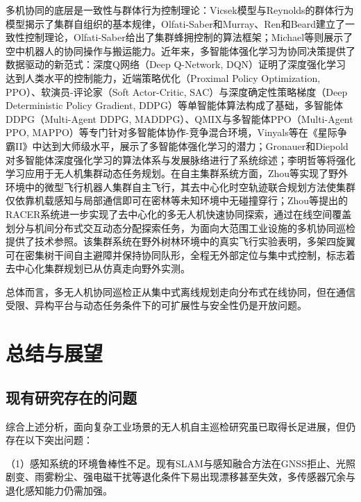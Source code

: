 多机协同的底层是一致性与群体行为控制理论：Vicsek模型\cite{vicsek1995novel}与Reynolds的群体行为模型\cite{reynolds1987flocks}揭示了集群自组织的基本规律，Olfati-Saber和Murray\cite{olfati2004consensus}、Ren和Beard\cite{ren2005consensus}建立了一致性控制理论，Olfati-Saber\cite{olfati2006flocking}给出了集群蜂拥控制的算法框架；Michael等则展示了空中机器人的协同操作与搬运能力。近年来，多智能体强化学习为协同决策提供了数据驱动的新范式：深度Q网络（Deep Q-Network, DQN）\cite{mnih2015human}证明了深度强化学习达到人类水平的控制能力，近端策略优化（Proximal Policy Optimization, PPO）\cite{schulman2017proximal}、软演员-评论家（Soft Actor-Critic, SAC）\cite{haarnoja2018soft}与深度确定性策略梯度（Deep Deterministic Policy Gradient, DDPG）\cite{lillicrap2016continuous}等单智能体算法构成了基础，多智能体DDPG（Multi-Agent DDPG, MADDPG）\cite{lowe2017multi}、QMIX\cite{rashid2018qmix}与多智能体PPO（Multi-Agent PPO, MAPPO）\cite{yu2022surprising}等专门针对多智能体协作-竞争混合环境，Vinyals等在《星际争霸II》中达到大师级水平，展示了多智能体强化学习的潜力；Gronauer和Diepold\cite{gronauer2022marl}对多智能体深度强化学习的算法体系与发展脉络进行了系统综述；李明哲等\cite{limz2023dynamic}将强化学习应用于无人机集群动态任务规划。在自主集群系统方面，Zhou等\cite{zhou2022swarm}实现了野外环境中的微型飞行机器人集群自主飞行，其去中心化时空轨迹联合规划方法\cite{zhou2021decentralized}使集群仅依靠机载感知与局部通信即可在密林等未知环境中无碰撞穿行；Zhou等\cite{zhou2023racer}提出的RACER系统进一步实现了去中心化的多无人机快速协同探索，通过在线空间覆盖划分与机间分布式交互动态分配探索任务，为面向大范围工业设施的多机协同巡检提供了技术参照。该集群系统在野外树林环境中的真实飞行实验表明，多架四旋翼可在密集树干间自主避障并保持协同队形，全程无外部定位与集中式控制，标志着去中心化集群规划已从仿真走向野外实测。


总体而言，多无人机协同巡检正从集中式离线规划走向分布式在线协同，但在通信受限、异构平台与动态任务条件下的可扩展性与安全性仍是开放问题。

\section{总结与展望}

\subsection{现有研究存在的问题}

综合上述分析，面向复杂工业场景的无人机自主巡检研究虽已取得长足进展，但仍存在以下突出问题：

（1）感知系统的环境鲁棒性不足。现有SLAM与感知融合方法在GNSS拒止、光照剧变、雨雾粉尘、强电磁干扰等退化条件下易出现漂移甚至失效\cite{cadena2016past,lvyang2019sense,wujq2021review}，多传感器冗余与退化感知能力仍需加强\cite{petrlik2020robust,mohta2018fast}。

